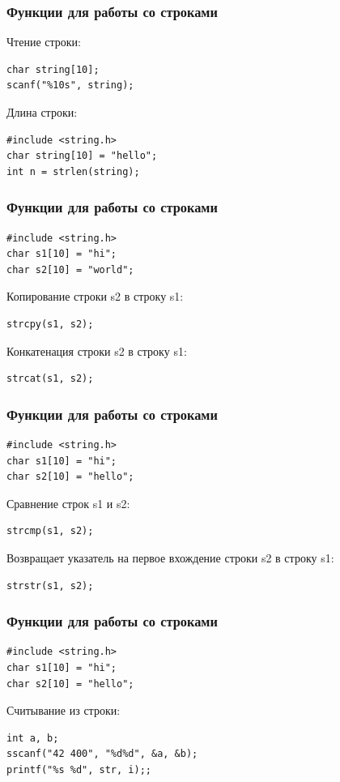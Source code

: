 \documentclass[14pt,pdf,hyperref={unicode}]{beamer}
\begin{document}
\begin{frame}[fragile]
\frametitle{Функции для работы со строками} 
Чтение строки:
\begin{lstlisting}
char string[10];
scanf("%10s", string);
\end{lstlisting}
Длина строки:
\begin{lstlisting}
#include <string.h>
char string[10] = "hello";
int n = strlen(string);
\end{lstlisting}
\end{frame}

\begin{frame}[fragile]
\frametitle{Функции для работы со строками} 
\begin{lstlisting}
#include <string.h>
char s1[10] = "hi";
char s2[10] = "world";
\end{lstlisting}
Копирование строки s2 в строку s1:
\begin{lstlisting}
strcpy(s1, s2);
\end{lstlisting}
Конкатенация строки s2 в строку s1:
\begin{lstlisting}
strcat(s1, s2);
\end{lstlisting}
\end{frame}

\begin{frame}[fragile]
\frametitle{Функции для работы со строками} 
\begin{lstlisting}
#include <string.h>
char s1[10] = "hi";
char s2[10] = "hello";
\end{lstlisting}
Сравнение строк s1 и s2:
\begin{lstlisting}
strcmp(s1, s2);
\end{lstlisting}
Возвращает указатель на первое вхождение строки s2 в строку s1:
\begin{lstlisting}
strstr(s1, s2);
\end{lstlisting}
\end{frame}



\begin{frame}[fragile]
\frametitle{Функции для работы со строками} 
\begin{lstlisting}
#include <string.h>
char s1[10] = "hi";
char s2[10] = "hello";
\end{lstlisting}
Считывание из строки:
\begin{lstlisting}
int a, b;
sscanf("42 400", "%d%d", &a, &b);
printf("%s %d", str, i);;
\end{lstlisting}
\end{frame}
\end{document}
